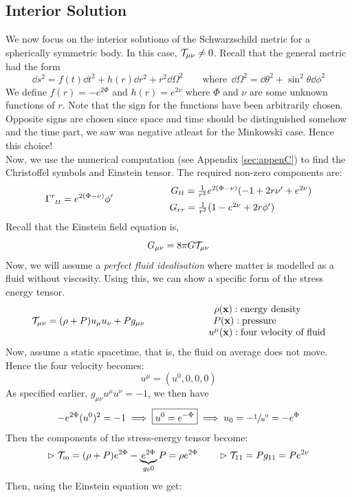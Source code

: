 \subsection{Interior Solution}
We now focus on the interior solutiono of the Schwarzschild metric for a spherically symmetric body. In this case, $\mathcal T_{\mu\nu}\neq 0$. Recall that the general metric had the form 
$$\dd s^2 = f(t)\dd t^2 + h(r)\dd r^2 + r^2\dd \Omega^2\qquad\text{where}\ \  \dd \Omega^2 = \dd\theta^2+ \sin^2\theta\dd \phi^2$$
We define $f(r) = -e^{2\Phi}$ and $h(r) = e^{2\nu}$ where $\Phi$ and $\nu$ are some unknown functions of $r$. Note that the sign for the functions have been arbitrarily chosen. Opposite signs are chosen since space and time should be distinguished somehow and the time part, we saw was negative atleast for the Minkowski case. Hence this choice!\\[0.2cm]
Now, we use the numerical computation (see Appendix \ref{sec:appenC}) to find the Christoffel symbols and Einstein tensor. The required non-zero components are:
$$\chris{r}{t}{t} = e^{2(\Phi-\nu)}\phi'\qquad \begin{matrix}
    \qquad\qquad G_{tt} = \frac{1}{r^2}e^{2(\Phi-\nu)}(-1 +2r\nu'+e^{2\nu})\\[0.2cm] G_{rr} = \frac{1}{r^2}(1-e^{2\nu}+2r\phi')
\end{matrix}$$
Recall that the Einstein field equation is,
$$G_{\mu\nu} = 8\pi G\mathcal T_{\mu\nu}$$
Now, we will assume a \textit{perfect fluid idealisation} where matter is modelled as a fluid without viscosity. Using this, we can show a specific form of the stress energy tensor. 
$$\mathcal T_{\mu\nu} = (\rho+P)u_\mu u_\nu + Pg_{\mu\nu} \qquad \begin{matrix}
    \qquad\ \ \rho(\vb{{x}}): \text{energy density}\\
    P(\vb{{x}}): \text{pressure}\\
    \qquad\qquad\ \ u^\mu(\vb{{x}}): \text{four velocity of fluid}
\end{matrix}$$
Now, assume a static spacetime, that is, the fluid on average does not move. Hence the four velocity becomes:
$$u^\mu = (u^0,0,0,0)$$
As specified earlier, $g_{\mu\nu}u^\mu u^\nu = -1 $, we then have $$-e^{2\Phi}(u^0)^2 = -1\implies \boxed{u^0= e^{-\Phi}}\implies u_0 = -\sfrac{1}{u^0}= -e^\Phi$$
Then the components of the stress-energy tensor become:
$$\vartriangleright \mathcal T_{\text{\tiny 00}} = (\rho+P)e^{2\Phi}-\underbrace{e^{2\Phi}}_{g_00}P = \rho e^{2\Phi} \qquad \vartriangleright \mathcal T_{11}= Pg_{11}= Pe^{2\nu}$$
Then, using the Einstein equation we get:
